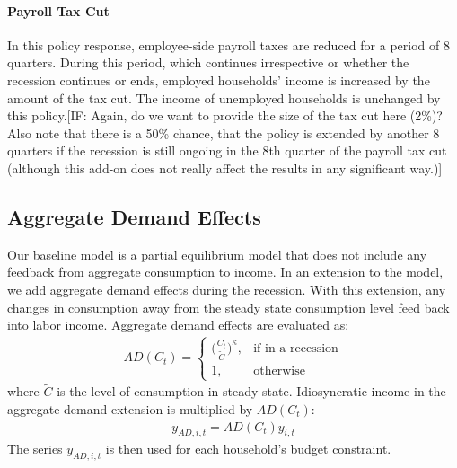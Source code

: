 \documentclass[../HAFiscal]{subfiles}
\begin{document}
	\paragraph{Payroll Tax Cut} In this policy response, employee-side payroll taxes are reduced for a period of 8 quarters. During this period, which continues irrespective or whether the recession continues or ends, employed households' income is increased by the amount of the tax cut. The income of unemployed households is unchanged by this policy.[IF: Again, do we want to provide the size of the tax cut here (2\%)? Also note that there is a 50\% chance, that the policy is extended by another 8 quarters if the recession is still ongoing in the 8th quarter of the payroll tax cut (although this add-on does not really affect the results in any significant way.)]
	
	\subsection{Aggregate Demand Effects}
	Our baseline model is a partial equilibrium model that does not include any feedback from aggregate consumption to income. In an extension to the model, we add aggregate demand effects during the recession. With this extension, any changes in consumption away from the steady state consumption level feed back into labor income. Aggregate demand effects are evaluated as:
	\begin{align}
	AD(C_t) =   \begin{cases}
				\Big(\frac{C_t}{\tilde{C}}\Big)^\kappa, & \text{if in a recession} \\
				1, & \text{otherwise} 
				\end{cases}
	\end{align}
	where $\tilde{C}$ is the level of consumption in steady state. Idiosyncratic income in the aggregate demand extension is multiplied by $AD(C_t)$:
	\begin{align}
	y_{AD,i,t} = AD(C_t)y_{i,t}
	\end{align}
	The series $y_{AD,i,t}$ is then used for each household's budget constraint.
\end{document}
